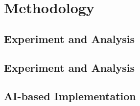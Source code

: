 \chapter{Methodology}
\label{ch:Methodology}

\section{Experiment and Analysis}
\label{sec:valve}

\section{Experiment and Analysis}
\label{sec:valve}

\section{AI-based Implementation}
\label{sec:AI-basedImplementation}